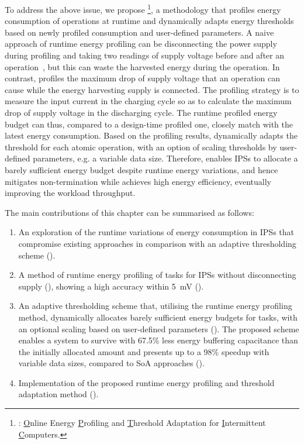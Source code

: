 To address the above issue, we propose \nn{}\footnote{\nn{}: \underline{O}nline Energy \underline{P}rofiling and \underline{T}hreshold Adaptation for \underline{I}ntermittent \underline{C}omputers. }, a methodology that profiles energy consumption of operations at runtime and dynamically adapts energy thresholds based on newly profiled consumption and user-defined parameters. 
A naive approach of runtime energy profiling can be disconnecting the power supply during profiling and taking two readings of supply voltage before and after an operation~\cite{zhan2020adaptive}, but this can waste the harvested energy during the operation. 
In contrast, \nn{} profiles the maximum drop of supply voltage that an operation can cause while the energy harvesting supply is connected. 
The profiling strategy is to measure the input current in the charging cycle so as to calculate the maximum drop of supply voltage in the discharging cycle. 
The runtime profiled energy budget can thus, compared to a design-time profiled one, closely match with the latest energy consumption. 
Based on the profiling results, \nn{} dynamically adapts the threshold for each atomic operation, with an option of scaling thresholds by user-defined parameters, e.g. a variable data size.
Therefore, \nn{} enables IPSs to allocate a barely sufficient energy budget despite runtime energy variations, and hence mitigates non-termination while achieves high energy efficiency, eventually improving the workload throughput.

The main contributions of this chapter can be summarised as follows:

\begin{enumerate}
    \item An exploration of the runtime variations of energy consumption in IPSs that compromise existing approaches in comparison with an adaptive thresholding scheme (). 
    \item A method of runtime energy profiling of tasks for IPSs without disconnecting supply (), showing a high accuracy within \SI{5}{\milli\volt} ().
    \item An adaptive thresholding scheme that, utilising the runtime energy profiling method, dynamically allocates barely sufficient energy budgets for tasks, with an optional scaling based on user-defined parameters (). 
    The proposed scheme enables a system to survive with 67.5\% less energy buffering capacitance than the initially allocated amount and presents up to a 98\% speedup with variable data sizes, compared to SoA approaches ().
    \item Implementation of the proposed runtime energy profiling and threshold adaptation method ().
\end{enumerate}